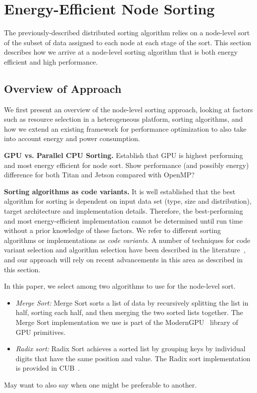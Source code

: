 \section{Energy-Efficient Node Sorting}
The previously-described distributed sorting algorithm relies
on a node-level sort of the subset of data assigned to each node at 
each stage of the sort.  This section describes how we arrive 
at a node-level sorting algorithm that is both energy efficient and
high performance.  

\subsection{Overview of Approach}
We first present an overview of the node-level sorting approach, 
looking at factors such as resource selection in a heterogeneous platform, 
sorting algorithms, and how we extend an existing framework for performance
optimization to also take into account energy and power consumption.

\vspace*{.1in}

\noindent
{\bf GPU vs. Parallel CPU Sorting.}
{\color{red}Establish that GPU is highest performing and most energy efficient for node sort.
Show performance (and possibly energy) 
difference for both Titan and Jetson compared with OpenMP?}  

\vspace*{.1in}

\noindent
{\bf Sorting algorithms as code variants.}
It is well established that the best algorithm for sorting
is dependent on input data set (type, size and distribution), target 
architecture and implementation details.   Therefore, the best-performing
and most energy-efficient implementation cannot
be determined until run time without a prior knowledge of these factors.
We refer to different sorting algorithms or implementations
as \emph{code variants}.  
A number of techniques for code variant selection and algorithm
selection have been described in the literature~\cite{algsel}, and our approach
will rely on recent advancements in this area as described in this section.
 
In this paper, we select among two algorithms to use for
the node-level sort.  
\begin{itemize}
\item \emph{Merge Sort:}
Merge Sort sorts a list of data by 
recursively splitting the list in half, sorting each half,
and then merging the two sorted lists together.
The Merge Sort implementation we use is
part of the ModernGPU~\cite{modernGPU} library of GPU
primitives.  
\item \emph{Radix sort:}
Radix Sort achieves a sorted list by grouping keys by individual digits  
that have the same position and value.
The Radix sort implementation is provided in CUB~\cite{cub}. 
\end{itemize}
{\color{red} May want to also say when one might be preferable to another.}

